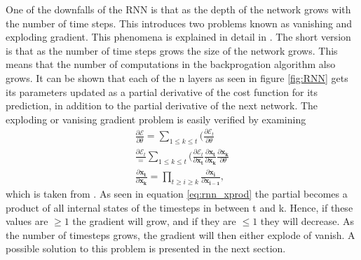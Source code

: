         One of the downfalls of the RNN is that as the depth of the network grows with the number of time steps. This introduces two problems known as vanishing and exploding gradient. This phenomena is explained in detail in \cite{Pascanu}. The short version is that as the number of time steps grows the size of the network grows. This means that the number of computations in the backprogation algorithm also grows. It can be shown that each of the n layers as seen in figure \ref{fig:RNN} gets its parameters updated as a partial derivative of the cost function for its prediction, in addition to the partial derivative of the next network. The exploding or vanising gradient problem is easily verified by examining 
        \begin{align}
            \frac{\partial \mathcal{E}}{\partial \theta} = \sum_{1\leq k \leq t}(\frac{\partial \mathcal{E}_t}{\partial \theta} \\
            \frac{\partial \mathcal{E}_t} = \sum_{1\leq k \leq t}(\frac{\partial \mathcal{E}_t}{\partial \bm{x_t}} \frac{\partial \bm{x_t}}{\partial \bm{x_k}}\frac{\partial \bm{x_k}}{\partial \theta}\\
            \frac{\partial \bm{x_t}}{\partial \bm{x_k}} = \prod_{t \geq i\geq k} \frac{\partial \bm{x_i}}{\partial \bm{x_{i-1}}}\label{eq:rnn_xprod}, 
        \end{align}
        which is taken from \cite{Pascanu}. As seen in equation \ref{eq:rnn_xprod} the partial becomes a product of all internal states of the timesteps in between t and k. Hence, if these values are $\geq1$ the gradient will grow, and if they are $\leq 1$ they will decrease. As the number of timesteps grows, the gradient will then either explode of vanish. A possible solution to this problem is presented in the next section.  
    

